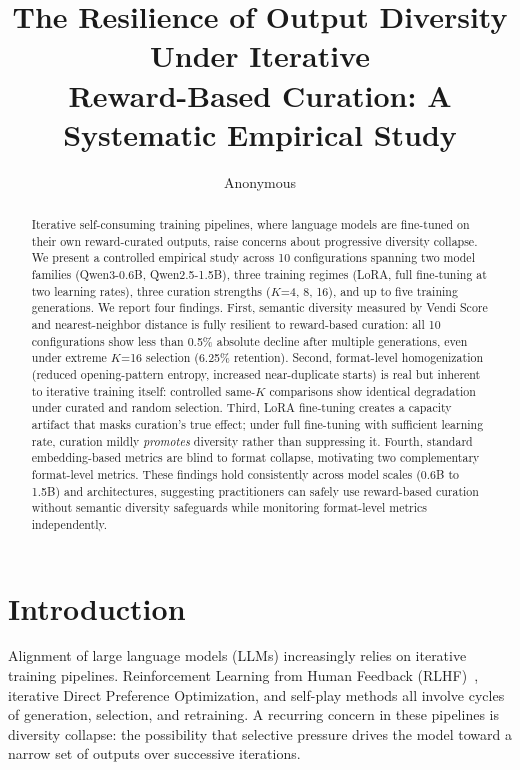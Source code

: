\documentclass[11pt,a4paper]{article}
\title{The Resilience of Output Diversity Under Iterative\\Reward-Based Curation: A Systematic Empirical Study}
\author{Anonymous}
\date{}
\begin{document}
\maketitle

\begin{abstract}
Iterative self-consuming training pipelines, where language models are fine-tuned on their own reward-curated outputs, raise concerns about progressive diversity collapse. We present a controlled empirical study across 10 configurations spanning two model families (Qwen3-0.6B, Qwen2.5-1.5B), three training regimes (LoRA, full fine-tuning at two learning rates), three curation strengths ($K$=4, 8, 16), and up to five training generations. We report four findings. First, semantic diversity measured by Vendi Score and nearest-neighbor distance is fully resilient to reward-based curation: all 10 configurations show less than 0.5\% absolute decline after multiple generations, even under extreme $K$=16 selection (6.25\% retention). Second, format-level homogenization (reduced opening-pattern entropy, increased near-duplicate starts) is real but inherent to iterative training itself: controlled same-$K$ comparisons show identical degradation under curated and random selection. Third, LoRA fine-tuning creates a capacity artifact that masks curation's true effect; under full fine-tuning with sufficient learning rate, curation mildly \textit{promotes} diversity rather than suppressing it. Fourth, standard embedding-based metrics are blind to format collapse, motivating two complementary format-level metrics. These findings hold consistently across model scales (0.6B to 1.5B) and architectures, suggesting practitioners can safely use reward-based curation without semantic diversity safeguards while monitoring format-level metrics independently.
\end{abstract}

\section{Introduction}

Alignment of large language models (LLMs) increasingly relies on iterative training pipelines. Reinforcement Learning from Human Feedback (RLHF)~\cite{ouyang2022training}, iterative Direct Preference Optimization, and self-play methods all involve cycles of generation, selection, and retraining. A recurring concern in these pipelines is diversity collapse: the possibility that selective pressure drives the model toward a narrow set of outputs over successive iterations.
\end{document}
